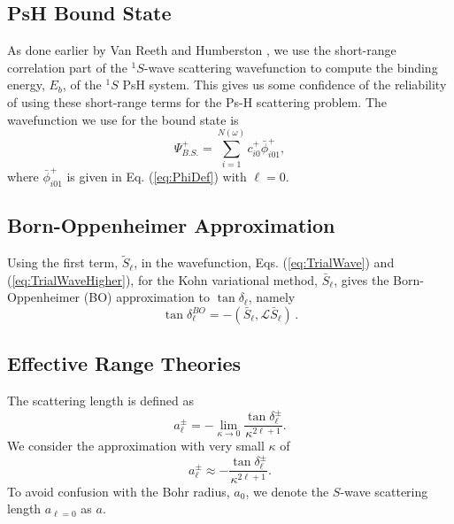 \documentclass[preprint,showpacs,showkeys,preprintnumbers,amsmath,amssymb,longbibliography,pra,aps]{revtex4-1}
\begin{document}
\subsection{PsH Bound State}
As done earlier by Van Reeth and Humberston \cite{VanReeth2003,VanReeth2004},
we use the short-range correlation part of the $^1S$-wave scattering wavefunction
to compute the binding energy, $E_b$, of the $^1S$ PsH system. This gives us
some confidence of the reliability of using these short-range terms for the Ps-H 
scattering problem. The wavefunction we use for the bound state is
\begin{equation}
\label{eq:BoundWavefn}
\Psi_{B.S.}^+ = \sum_{i=1}^{N(\omega)} c_{i0}^+ \bar{\phi}_{i01}^+,
\end{equation}
where $\bar{\phi}_{i01}^+$ is given in Eq. (\ref{eq:PhiDef}) with
$\ell = 0$.

\subsection{Born-Oppenheimer Approximation}
Using the first term, $\widetilde{S}_\ell$, in the wavefunction,
Eqs. (\ref{eq:TrialWave}) and (\ref{eq:TrialWaveHigher}), for
the Kohn variational method, $\bar S_\ell$, gives the
Born-Oppenheimer (BO) approximation to $\tan\delta_\ell$, namely
\begin{equation}
\label{eq:Born}
\tan\delta_\ell^{BO} = -(\bar{S}_\ell,\mathcal{L}\bar{S}_\ell)\,.
\end{equation}


\subsection{Effective Range Theories}

The scattering length \cite{Bransden2003} is defined as
\begin{equation}
\label{eq:ScatLen}
a_\ell^\pm = -\lim_{\kappa \to 0}
  \frac{\tan{\delta_\ell^\pm}}{\kappa^{2\ell+1}}.
\end{equation}
We consider the approximation with very small $\kappa$ of
\begin{equation}
\label{eq:ScatLenApprox}
a_\ell^\pm \approx
  - \frac{\tan{\delta_\ell^\pm}}{\kappa^{2\ell+1}}.
\end{equation}
To avoid confusion with the Bohr radius, $a_0$, we denote
the $S$-wave scattering length $a_{\ell=0}$ as $a$.
\end{document}
